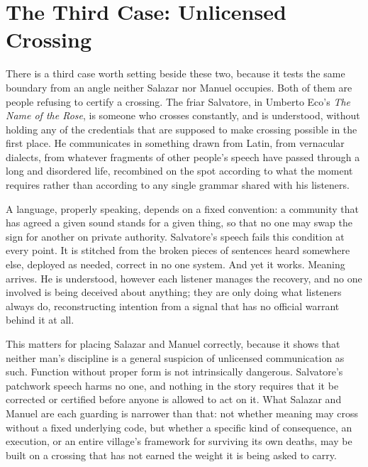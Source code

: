 \documentclass[12pt]{article}
\begin{document}
\section*{The Third Case: Unlicensed Crossing}

There is a third case worth setting beside these two, because it tests the same boundary from an angle neither Salazar nor Manuel occupies. Both of them are people refusing to certify a crossing. The friar Salvatore, in Umberto Eco's \textit{The Name of the Rose}, is someone who crosses constantly, and is understood, without holding any of the credentials that are supposed to make crossing possible in the first place.\cite{eco1980} He communicates in something drawn from Latin, from vernacular dialects, from whatever fragments of other people's speech have passed through a long and disordered life, recombined on the spot according to what the moment requires rather than according to any single grammar shared with his listeners. 

A language, properly speaking, depends on a fixed convention: a community that has agreed a given sound stands for a given thing, so that no one may swap the sign for another on private authority. Salvatore's speech fails this condition at every point. It is stitched from the broken pieces of sentences heard somewhere else, deployed as needed, correct in no one system. And yet it works. Meaning arrives. He is understood, however each listener manages the recovery, and no one involved is being deceived about anything; they are only doing what listeners always do, reconstructing intention from a signal that has no official warrant behind it at all.

This matters for placing Salazar and Manuel correctly, because it shows that neither man's discipline is a general suspicion of unlicensed communication as such. Function without proper form is not intrinsically dangerous. Salvatore's patchwork speech harms no one, and nothing in the story requires that it be corrected or certified before anyone is allowed to act on it. What Salazar and Manuel are each guarding is narrower than that: not whether meaning may cross without a fixed underlying code, but whether a specific kind of consequence, an execution, or an entire village's framework for surviving its own deaths, may be built on a crossing that has not earned the weight it is being asked to carry. 
\end{document}
